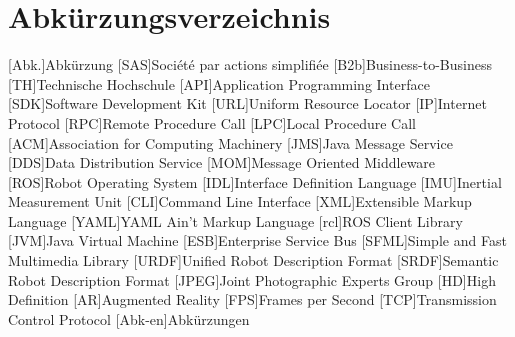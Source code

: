 
\chapter*{Abkürzungsverzeichnis}                   %

\begin{acronym}[DHBW]
  [Abk.]{Abkürzung}
  [SAS]{Société par actions simplifiée}
  [B2b]{Business-to-Business}
  [TH]{Technische Hochschule}
  [API]{Application Programming Interface}
  [SDK]{Software Development Kit}
  [URL]{Uniform Resource Locator}
  [IP]{Internet Protocol}
  [RPC]{Remote Procedure Call}
  [LPC]{Local Procedure Call}
  [ACM]{Association for Computing Machinery}
  [JMS]{Java Message Service}
  [DDS]{Data Distribution Service}
  [MOM]{Message Oriented Middleware}
  [ROS]{Robot Operating System}
  [IDL]{Interface Definition Language}
  [IMU]{Inertial Measurement Unit}
  [CLI]{Command Line Interface}
  [XML]{Extensible Markup Language}
  [YAML]{YAML Ain't Markup Language}
  [rcl]{ROS Client Library}
  [JVM]{Java Virtual Machine}
  [ESB]{Enterprise Service Bus}
  [SFML]{Simple and Fast Multimedia Library}
  [URDF]{Unified Robot Description Format}
  [SRDF]{Semantic Robot Description Format}
  [JPEG]{Joint Photographic Experts Group}
  [HD]{High Definition}
  [AR]{Augmented Reality}
  [FPS]{Frames per Second}
  [TCP]{Transmission Control Protocol}
  [Abk-en]{Abkürzungen}
\end{acronym}
